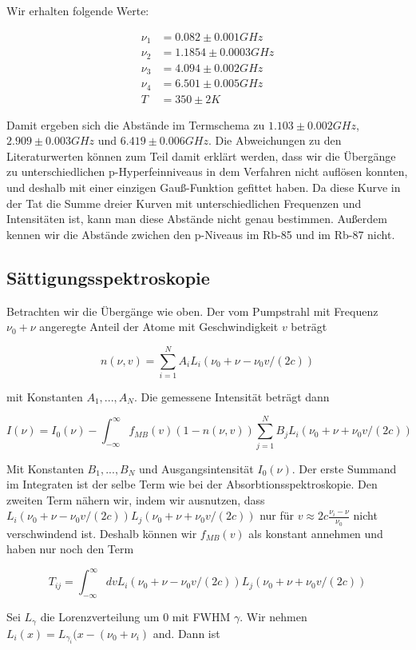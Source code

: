 \documentclass[a4paper,parskip]{scrartcl}
\begin{document}
Wir erhalten folgende Werte:

\begin{align*}
\nu_1 &= 0.082 \pm 0.001 GHz \\
\nu_2 &= 1.1854 \pm 0.0003 GHz \\
\nu_3 &= 4.094 \pm 0.002 GHz\\
\nu_4 &= 6.501 \pm 0.005 GHz \\
T&=350 \pm 2 K
\end{align*}

Damit ergeben sich die Abstände im Termschema zu $1.103 \pm 0.002 GHz$,  $2.909 \pm 0.003 GHz$ und $6.419 \pm 0.006 GHz$. Die Abweichungen zu den Literaturwerten können zum Teil damit erklärt werden, dass wir die Übergänge zu unterschiedlichen p-Hyperfeinniveaus in dem Verfahren nicht auflösen konnten, und deshalb mit einer einzigen Gauß-Funktion gefittet haben. Da diese Kurve in der Tat die Summe dreier Kurven mit unterschiedlichen Frequenzen und Intensitäten ist, kann man diese Abstände nicht genau bestimmen. Außerdem kennen wir die Abstände zwichen den p-Niveaus im Rb-85 und im Rb-87 nicht.

\subsection{Sättigungsspektroskopie}

Betrachten wir die Übergänge wie oben. Der vom Pumpstrahl mit Frequenz $\nu_0+\nu$ angeregte Anteil der Atome mit Geschwindigkeit $v$ beträgt

$$n(\nu, v) = \sum_{i=1}^N A_i L_i(\nu_0+\nu-\nu_0 v/(2c))$$

mit Konstanten $A_1, ..., A_N$. Die gemessene Intensität beträgt dann

$$I(\nu) = I_0(\nu)-\int_{-\infty}^{\infty} f_{MB}(v)(1-n(\nu, v))\sum_{j=1}^N B_j L_i(\nu_0+\nu+\nu_0 v/(2c))$$

Mit Konstanten $B_1, ..., B_N$ und Ausgangsintensität $I_0(\nu)$. Der erste Summand im Integraten ist der selbe Term wie bei der Absorbtionsspektroskopie. Den zweiten Term nähern wir, indem wir ausnutzen, dass  $L_i(\nu_0+\nu-\nu_0 v/(2c)) L_j(\nu_0+\nu+\nu_0 v/(2c))$ nur für $v \approx 2c \frac{\nu_i-\nu}{\nu_0}$ nicht verschwindend ist. Deshalb können wir $f_{MB}(v)$ als konstant annehmen und haben nur noch den Term

$$T_{ij}=\int_{-\infty}^\infty dv L_i(\nu_0+\nu-\nu_0 v/(2c)) L_j(\nu_0+\nu+\nu_0 v/(2c))$$

Sei $L_\gamma$ die Lorenzverteilung um 0 mit FWHM $\gamma$. Wir nehmen $L_i(x) = L_{\gamma_i}(x-(\nu_0+\nu_i)$ and. Dann ist
\end{document}
